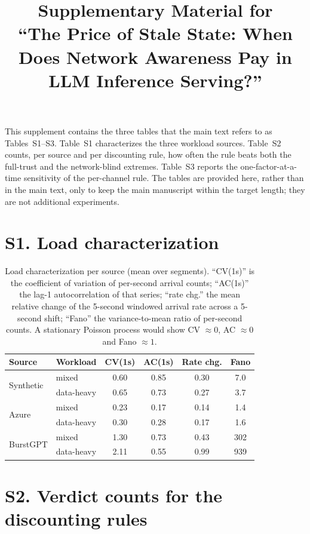 \documentclass[11pt,a4paper]{article}
\title{Supplementary Material for\\[2pt]
\large “The Price of Stale State: When Does Network Awareness Pay in LLM Inference Serving?”}
\author{}
\date{}
\begin{document}
\maketitle

\noindent This supplement contains the three tables that the main text refers to as
Tables~S1--S3. Table~S1 characterizes the three workload sources. Table~S2 counts, per
source and per discounting rule, how often the rule beats both the full-trust and the
network-blind extremes. Table~S3 reports the one-factor-at-a-time sensitivity of the
per-channel rule. The tables are provided here, rather than in the main text, only to keep
the main manuscript within the target length; they are not additional experiments.

\section*{S1. Load characterization}

\begin{table}[h]
\centering
\caption{Load characterization per source (mean over segments). “CV(1s)” is the coefficient of
variation of per-second arrival counts; “AC(1s)” the lag-1 autocorrelation of that series;
“rate chg.” the mean relative change of the 5-second windowed arrival rate across a 5-second
shift; “Fano” the variance-to-mean ratio of per-second counts. A stationary Poisson process
would show CV $\approx 0$, AC $\approx 0$ and Fano $\approx 1$.}
\small
\begin{tabular}{@{}llcccc@{}}
\toprule
Source & Workload & CV(1s) & AC(1s) & Rate chg. & Fano \\
\midrule
\multirow{2}{*}{Synthetic} & mixed      & 0.60 & 0.85 & 0.30 & 7.0 \\
                           & data-heavy & 0.65 & 0.73 & 0.27 & 3.7 \\
\multirow{2}{*}{Azure}     & mixed      & 0.23 & 0.17 & 0.14 & 1.4 \\
                           & data-heavy & 0.30 & 0.28 & 0.17 & 1.6 \\
\multirow{2}{*}{BurstGPT}  & mixed      & 1.30 & 0.73 & 0.43 & 302 \\
                           & data-heavy & 2.11 & 0.55 & 0.99 & 939 \\
\bottomrule
\end{tabular}
\end{table}

\section*{S2. Verdict counts for the discounting rules}
\end{document}
